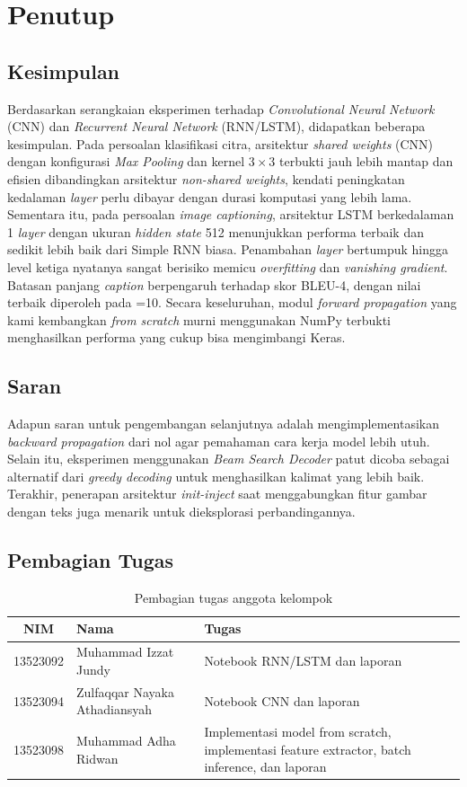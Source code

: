 \section{Penutup}
\subsection{Kesimpulan}
Berdasarkan serangkaian eksperimen terhadap \textit{Convolutional Neural Network} (CNN) dan \textit{Recurrent Neural Network} (RNN/LSTM), didapatkan beberapa kesimpulan. Pada persoalan klasifikasi citra, arsitektur \textit{shared weights} (CNN) dengan konfigurasi \textit{Max Pooling} dan kernel $3 \times 3$ terbukti jauh lebih mantap dan efisien dibandingkan arsitektur \textit{non-shared weights}, kendati peningkatan kedalaman \textit{layer} perlu dibayar dengan durasi komputasi yang lebih lama. Sementara itu, pada persoalan \textit{image captioning}, arsitektur LSTM berkedalaman 1 \textit{layer} dengan ukuran \textit{hidden state} 512 menunjukkan performa terbaik dan sedikit lebih baik dari Simple RNN biasa. Penambahan \textit{layer} bertumpuk hingga level ketiga nyatanya sangat berisiko memicu \textit{overfitting} dan \textit{vanishing gradient}. Batasan panjang \textit{caption} berpengaruh terhadap skor BLEU-4, dengan nilai terbaik diperoleh pada =10. Secara keseluruhan, modul \textit{forward propagation} yang kami kembangkan \textit{from scratch} murni menggunakan NumPy terbukti menghasilkan performa yang cukup bisa mengimbangi Keras.

\subsection{Saran}
Adapun saran untuk pengembangan selanjutnya adalah mengimplementasikan \textit{backward propagation} dari nol agar pemahaman cara kerja model lebih utuh. Selain itu, eksperimen menggunakan \textit{Beam Search Decoder} patut dicoba sebagai alternatif dari \textit{greedy decoding} untuk menghasilkan kalimat yang lebih baik. Terakhir, penerapan arsitektur \textit{init-inject} saat menggabungkan fitur gambar dengan teks juga menarik untuk dieksplorasi perbandingannya.

\subsection{Pembagian Tugas}

\begin{table}[H]
\centering
\caption{Pembagian tugas anggota kelompok}
\begin{tabular}{clp{9cm}}
\toprule
\textbf{NIM} & \textbf{Nama} & \textbf{Tugas} \\
\midrule
13523092 & Muhammad Izzat Jundy          & Notebook RNN/LSTM dan laporan \\
13523094 & Zulfaqqar Nayaka Athadiansyah & Notebook CNN dan laporan \\
13523098 & Muhammad Adha Ridwan          & Implementasi model from scratch, implementasi feature extractor, batch inference, dan laporan \\
\bottomrule
\end{tabular}
\end{table}
